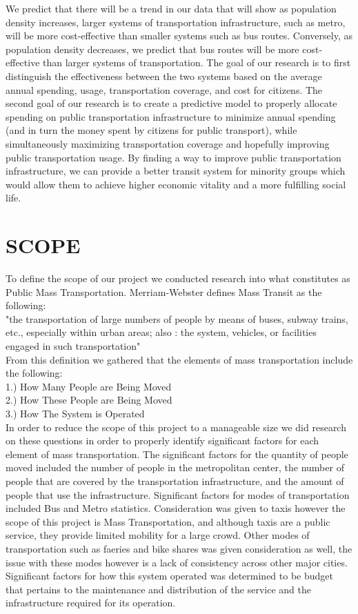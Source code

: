 \documentclass[12pt]{article}
\begin{document}
\begin{multicols}{2}
We predict that there will be a trend in our data that will show as population density increases, larger systems of transportation infrastructure, such as metro, will be more cost-effective than smaller systems such as bus routes. Conversely, as population density decreases, we predict that bus routes will be more cost-effective than larger systems of transportation. The goal of our research is to first distinguish the effectiveness between the two systems based on the average annual spending, usage, transportation coverage, and cost for citizens. The second goal of our research is to create a predictive model to properly allocate spending on public transportation infrastructure to minimize annual spending (and in turn the money spent by citizens for public transport), while simultaneously maximizing transportation coverage and hopefully improving public transportation usage. By finding a way to improve public transportation infrastructure, we can provide a better transit system for minority groups which would allow them to achieve higher economic vitality and a more fulfilling social life.

\section{SCOPE}
To define the scope of our project we conducted research into what constitutes as Public Mass Transportation. Merriam-Webster defines Mass Transit as the following:\\
	"the transportation of large numbers of people by means of buses, subway trains, etc., especially within urban areas; also : the system, vehicles, or facilities engaged in such transportation"\\
From this definition we gathered that the elements of mass transportation include the following:\\
1.) How Many People are Being Moved\\
2.) How These People are Being Moved\\
3.) How The System is Operated\\
In order to reduce the scope of this project to a manageable size we did research on these questions in order to properly identify significant factors for each element of mass transportation. The significant factors for the quantity of people moved included the number of people in the metropolitan center, the number of people that are covered by the transportation infrastructure, and the amount of people that use the infrastructure. Significant factors for modes of transportation included Bus and Metro statistics. Consideration was given to taxis however the scope of this project is Mass Transportation, and although taxis are a public service, they provide limited mobility for a large crowd. Other modes of transportation such as faeries and bike shares was given consideration as well, the issue with these modes however is a lack of consistency across other major cities. Significant factors for how this system operated was determined to be budget that pertains to the maintenance and distribution of the service and the infrastructure required for its operation.


\end{multicols}
\end{document}
